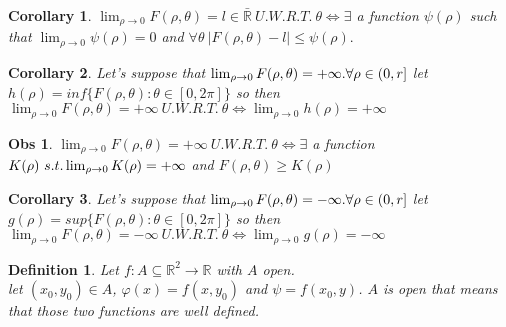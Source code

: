 \documentclass{article}
\newtheorem{observation}{Obs}
\newtheorem{corollary}{Corollary}
\newtheorem{definition}{Definition}
\begin{document}
    \begin{corollary}
        $\lim_{\rho \to 0} F(\rho, \theta) = l \in \bar{\mathbb{R}} \ U.W.R.T. \ \theta \Longleftrightarrow \exists$ a function $\psi(\rho)$ such that $\lim_{\rho \to 0} \psi(\rho) = 0$ and $\forall \theta \ \left\lvert F(\rho, \theta) - l\right\rvert \leqslant \psi(\rho).$
    \end{corollary}
    \begin{corollary}
        Let's suppose that $\lim_{\rho \to 0} F(\rho, \theta) = +\infty. \\ \forall \rho \in (0,r]$ let $h(\rho) = inf\{F(\rho, \theta) : \theta \in [0,2\pi] \}$ so then $\lim_{\rho \to 0} F(\rho, \theta) = +\infty \ U.W.R.T. \ \theta \Longleftrightarrow \lim_{\rho \to 0} h(\rho) = +\infty $
    \end{corollary}
    \begin{observation}
        $\lim_{\rho \to 0} F(\rho, \theta) = +\infty \ U.W.R.T. \ \theta \Longleftrightarrow \exists$ a function $K(\rho) \ s.t. \\ \lim_{\rho \to 0}K(\rho) = +\infty$ and $F(\rho,\theta) \geq K(\rho)$ 
    \end{observation}
    \begin{corollary}
        Let's suppose that $\lim_{\rho \to 0} F(\rho, \theta) = -\infty. \\ \forall \rho \in (0,r]$ let $g(\rho) = sup\{F(\rho, \theta) : \theta \in [0,2\pi] \}$ so then $\lim_{\rho \to 0} F(\rho, \theta) = -\infty \ U.W.R.T. \ \theta \Longleftrightarrow \lim_{\rho \to 0} g(\rho) = -\infty$
    \end{corollary}
    \begin{definition}
        Let $f : A \subseteq \mathbb{R}^2 \rightarrow \mathbb{R}$ with $A$ open.\\
        let $(x_0,y_0) \in A$, $\varphi(x) = f(x,y_0)$ and $\psi = f(x_0,y)$.
        $A$ is open that means that those two functions are well defined. 
    \end{definition}
\end{document}
